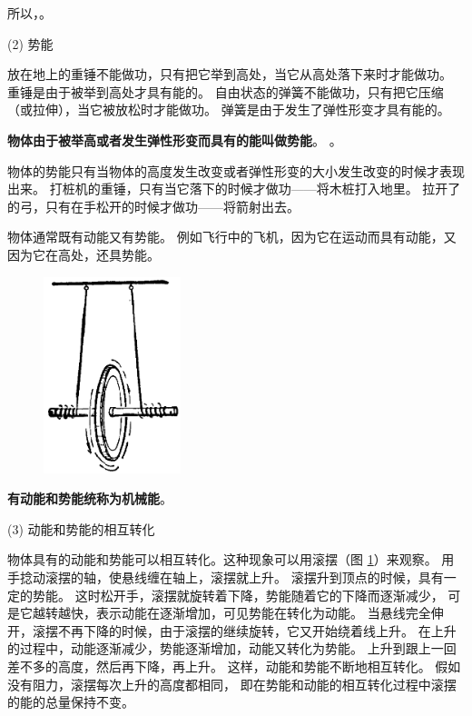 所以，。



(2) 势能

放在地上的重锤不能做功，只有把它举到高处，当它从高处落下来时才能做功。
重锤是由于被举到高处才具有能的。
自由状态的弹簧不能做功，只有把它压缩（或拉伸），当它被放松时才能做功。
弹簧是由于发生了弹性形变\footnotemark 才具有能的。

\textbf{物体由于被举高或者发生弹性形变而具有的能叫做势能}。
。

物体的势能只有当物体的高度发生改变或者弹性形变的大小发生改变的时候才表现出来。
打桩机的重锤，只有当它落下的时候才做功——将木桩打入地里。
拉开了的弓，只有在手松开的时候才做功——将箭射出去。

物体通常既有动能又有势能。
例如飞行中的飞机，因为它在运动而具有动能，又因为它在高处，还具势能。

\begin{figure}
    \centering
    \includegraphics[width=4cm]{../pic/czwl1-ch8-12}
    \caption{}\label{fig:8-12}
\end{figure}

\textbf{有动能和势能统称为机械能}。



(3) 动能和势能的相互转化

物体具有的动能和势能可以相互转化。这种现象可以用滚摆（图 \ref{fig:8-12}）来观察。
用手捻动滚摆的轴，使悬线缠在轴上，滚摆就上升。
滚摆升到顶点的时候，具有一定的势能。
这时松开手，滚摆就旋转着下降，势能随着它的下降而逐渐减少，
可是它越转越快，表示动能在逐渐增加，可见势能在转化为动能。
当悬线完全伸开，滚摆不再下降的时候，由于滚摆的继续旋转，它又开始绕着线上升。
在上升的过程中，动能逐渐减少，势能逐渐增加，动能又转化为势能。
上升到跟上一回差不多的高度，然后再下降，再上升。
这样，动能和势能不断地相互转化。
假如没有阻力，滚摆每次上升的高度都相同，
即在势能和动能的相互转化过程中滚摆的能的总量保持不变。


